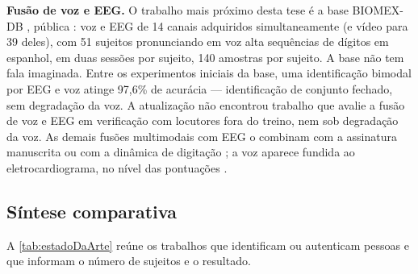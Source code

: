 			\par \textbf{Fusão de voz e \ac{EEG}.} O trabalho mais próximo desta tese é a base BIOMEX-DB \cite{morenorodriguez2021biomex}, pública \cite{morenorodriguez2021biomexdata}: voz e \ac{EEG} de 14 canais adquiridos simultaneamente (e vídeo para 39 deles), com 51 sujeitos pronunciando em voz alta sequências de dígitos em espanhol, em duas sessões por sujeito, 140 amostras por sujeito. A base não tem fala imaginada. Entre os experimentos iniciais da base, uma identificação bimodal por \ac{EEG} e voz atinge 97,6\% de acurácia --- identificação de conjunto fechado, sem degradação da voz. A atualização não encontrou trabalho que avalie a fusão de voz e \ac{EEG} em verificação com locutores fora do treino, nem sob degradação da voz. As demais fusões multimodais com \ac{EEG} o combinam com a assinatura manuscrita \cite{das2025multimodal} ou com a dinâmica de digitação \cite{rahman2022robust}; a voz aparece fundida ao eletrocardiograma, no nível das pontuações \cite{zehir2025unifying}.

		\subsection{Síntese comparativa}

			\par A \autoref{tab:estadoDaArte} reúne os trabalhos que identificam ou autenticam pessoas e que informam o número de sujeitos e o resultado.

